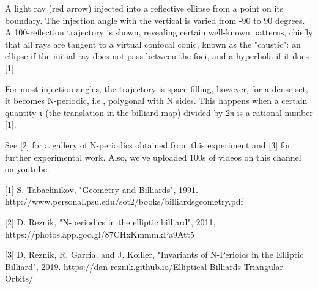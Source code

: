 A light ray (red arrow) injected into a reflective ellipse from a point on its boundary. The injection angle with the vertical is varied from -90 to 90 degrees. A 100-reflection trajectory is shown, revealing certain well-known patterns, chiefly that all rays are tangent to a virtual confocal conic, known as the "caustic": an ellipse if the initial ray does not pass between the foci, and a hyperbola if it does [1].

For most injection angles, the trajectory is space-filling, however, for a dense set, it becomes N-periodic, i.e., polygonal with N sides. This happens when a certain quantity τ (the translation in the billiard map) divided by 2π is a rational number [1].

See [2] for a gallery of N-periodics obtained from this experiment and [3] for further experimental work. Also, we've uploaded 100s of videos on this channel on youtube.

[1] S. Tabachnikov, "Geometry and Billiards", 1991. http://www.personal.psu.edu/sot2/books/billiardsgeometry.pdf

[2] D. Reznik, "N-periodics in the elliptic billiard", 2011, https://photos.app.goo.gl/87CHxKmmmkPa9Att5

[3] D. Reznik, R. Garcia, and J. Koiller, "Invariants of N-Perioics in the Elliptic Billiard", 2019. https://dan-reznik.github.io/Elliptical-Billiards-Triangular-Orbits/